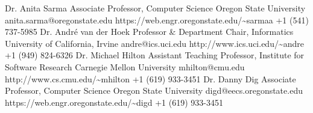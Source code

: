 \documentclass[localFont,alternative]{yaac-another-awesome-cv}
\begin{document}
\begin{references}
		{Dr. Anita Sarma}
		{Associate Professor, Computer Science}
		{Oregon State University}
		{anita.sarma@oregonstate.edu}
		{https://web.engr.oregonstate.edu/\textasciitilde sarmaa}
		{+1 (541) 737-5985}
		{Dr. André van der Hoek}
		{Professor \& Department Chair, Informatics}
		{University of California, Irvine}
		{andre@ics.uci.edu}
		{http://www.ics.uci.edu/\textasciitilde andre}
		{+1 (949) 824-6326}
    \newline{}
        {Dr. Michael Hilton}
        {Assistant Teaching Professor, Institute for Software Research}
        {Carnegie Mellon University}
        {mhilton@cmu.edu}
        {http://www.cs.cmu.edu/\textasciitilde mhilton}
        {+1 (619) 933-3451}
        {Dr. Danny Dig}
        {Associate Professor, Computer Science}
        {Oregon State University}
        {digd@eecs.oregonstate.edu}
        {https://web.engr.oregonstate.edu/\textasciitilde digd}
        {+1 (619) 933-3451}
\end{references}

%	
\end{document}
